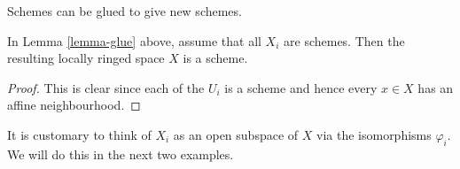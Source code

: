 \begin{lemma}
\label{lemma-glue-schemes}
\begin{slogan}
Schemes can be glued to give new schemes.
\end{slogan}
In Lemma \ref{lemma-glue} above, assume that all
$X_i$ are schemes. Then the resulting locally ringed
space $X$ is a scheme.
\end{lemma}

\begin{proof}
This is clear since each of the $U_i$ is a scheme
and hence every $x \in X$ has an affine neighbourhood.
\end{proof}

\noindent
It is customary to think of $X_i$ as an open subspace of
$X$ via the isomorphisms $\varphi_i$. We will do this in
the next two examples.



\nocite{*}




